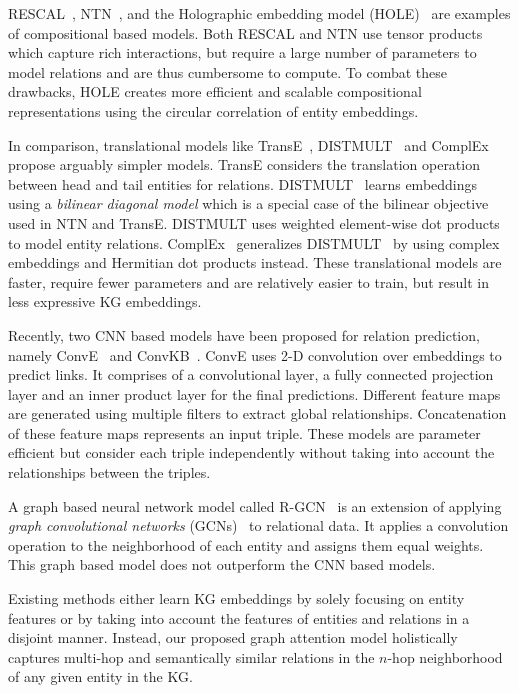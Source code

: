 \documentclass[11pt,a4paper]{article}
\begin{document}
RESCAL~\cite{Nickel2011}, NTN~\cite{socher2013reasoning}, and the Holographic embedding
model (HOLE)~\cite{nickel2016holographic} are examples of compositional based models. 
Both RESCAL and NTN use tensor products which capture rich interactions, but 
require a large number of parameters to model relations and are thus cumbersome to compute. 
To combat these drawbacks, HOLE creates more efficient and scalable 
compositional representations using the circular correlation of entity embeddings.



In comparison, translational models like TransE~\cite{NIPS2013_5071}, DISTMULT~\cite{yang2014} and ComplEx~\cite{trouillon2016complex} propose arguably simpler models. 
TransE considers the translation operation between head and tail entities for relations. 
DISTMULT~\cite{yang2014} learns embeddings using a \emph{bilinear diagonal model} which is a special case of the bilinear objective used in NTN and TransE. DISTMULT uses weighted element-wise dot products to model entity relations.
ComplEx~\cite{trouillon2016complex} generalizes DISTMULT~\cite{yang2014} by using complex  
embeddings and Hermitian dot products instead. 
These translational models are faster, require fewer parameters and are relatively easier to train, but 
result in less expressive KG embeddings.

Recently, two CNN based models have been proposed for relation prediction, namely ConvE~\cite{dettmers2018convolutional} and ConvKB~\cite{nguyen2018novel}. 
ConvE uses 2-D convolution over embeddings to
predict links. It comprises of a convolutional layer, a fully connected projection layer and an inner product layer for the final predictions. 
Different feature maps are generated using multiple filters to extract global relationships.
Concatenation of these feature maps represents an input triple. These models are parameter efficient but 
consider each triple independently without taking into account the relationships between the triples.

A graph based neural network model called R-GCN~\cite{schlichtkrull2018modeling} is an extension of applying \emph{graph convolutional networks} (GCNs)~\cite{kipf2017semi} to relational data. 
It applies a convolution operation to the neighborhood of each entity and assigns them equal weights. 
This graph based model does not outperform the CNN based models.

Existing methods either learn KG embeddings by solely focusing on entity features or by taking into account the features of entities and relations in a disjoint manner. Instead, our proposed graph attention model holistically captures multi-hop and semantically similar relations in the $n$-hop neighborhood of any given entity in the KG.
\end{document}
